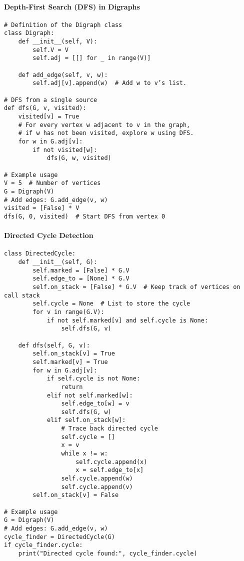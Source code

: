 \documentclass{article}
\begin{document}
\paragraph{Depth-First Search (DFS) in Digraphs}

\begin{verbatim}
# Definition of the Digraph class
class Digraph:
    def __init__(self, V):
        self.V = V
        self.adj = [[] for _ in range(V)]

    def add_edge(self, v, w):
        self.adj[v].append(w)  # Add w to v’s list.

# DFS from a single source
def dfs(G, v, visited):
    visited[v] = True
    # For every vertex w adjacent to v in the graph,
    # if w has not been visited, explore w using DFS.
    for w in G.adj[v]:
        if not visited[w]:
            dfs(G, w, visited)

# Example usage
V = 5  # Number of vertices
G = Digraph(V)
# Add edges: G.add_edge(v, w)
visited = [False] * V
dfs(G, 0, visited)  # Start DFS from vertex 0
\end{verbatim}

\paragraph{Directed Cycle Detection}

\begin{verbatim}
class DirectedCycle:
    def __init__(self, G):
        self.marked = [False] * G.V
        self.edge_to = [None] * G.V
        self.on_stack = [False] * G.V  # Keep track of vertices on call stack
        self.cycle = None  # List to store the cycle
        for v in range(G.V):
            if not self.marked[v] and self.cycle is None:
                self.dfs(G, v)

    def dfs(self, G, v):
        self.on_stack[v] = True
        self.marked[v] = True
        for w in G.adj[v]:
            if self.cycle is not None:
                return
            elif not self.marked[w]:
                self.edge_to[w] = v
                self.dfs(G, w)
            elif self.on_stack[w]:
                # Trace back directed cycle
                self.cycle = []
                x = v
                while x != w:
                    self.cycle.append(x)
                    x = self.edge_to[x]
                self.cycle.append(w)
                self.cycle.append(v)
        self.on_stack[v] = False

# Example usage
G = Digraph(V)
# Add edges: G.add_edge(v, w)
cycle_finder = DirectedCycle(G)
if cycle_finder.cycle:
    print("Directed cycle found:", cycle_finder.cycle)
\end{verbatim}
\end{document}
